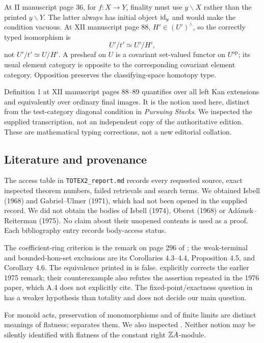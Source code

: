 \begin{remark}\label{D:typing}
At II manuscript page 36, for $f:X\to Y$, finality must use
$y\backslash X$ rather than the printed $y\backslash Y$.
The latter always has initial object $\mathrm{id}_y$ and would make
the condition vacuous. At XII manuscript page 88,
$H'\in(U')^\wedge$, so the correctly typed isomorphism is
\[
 U'/t'\simeq U'/H',
\]
not $U'/t'\simeq U/H'$. A presheaf on $U$ is a covariant
set-valued functor on $U^{\mathrm{op}}$; its usual element
category is opposite to the corresponding covariant element
category. Opposition preserves the classifying-space homotopy type.

Definition 1 at XII manuscript pages 88--89 quantifies over
all left Kan extensions and equivalently over ordinary final
images. It is the notion used here, distinct from the
test-category diagonal condition in \emph{Pursuing Stacks}.
We inspected the supplied transcription, not an independent
copy of the authoritative edition. These are mathematical
typing corrections, not a new editorial collation.
\end{remark}

\subsection{Literature and provenance}
The access table in \texttt{TOTEX2\_report.md} records every
requested source, exact inspected theorem numbers, failed
retrievals and search terms. We obtained Isbell (1968) and
Gabriel--Ulmer (1971), which had not been opened in the
supplied record. We did not obtain the bodies of Isbell (1974),
Oberst (1968) or Ad\'amek--Reiterman (1975). No claim about
their unopened contents is used as a proof. Each bibliography
entry records body-access status.

The coefficient-ring criterion is the remark on page 296 of
\citet{IsbellMitchell1976}; the weak-terminal and bounded-hom-set
exclusions are its Corollaries 4.3--4.4, Proposition 4.5, and
Corollary 4.6. The equivalence printed in
\citet[II.3]{AdamekReiterman1976} is false.
\citet[Remark A.4]{AdamekKoubekReiterman1981} explicitly corrects
the earlier 1975 remark; their counterexample also refutes the
assertion repeated in the 1976 paper, which A.4 does not explicitly cite.
The fixed-point/exactness question in
\citet[Problem 2.5]{Husainov2002} has a weaker hypothesis
than totality and does not decide our main question.

For monoid acts, preservation of monomorphisms and of finite
limits are distinct meanings of flatness;
\citet[Definition 1.6, Proposition 1.8, Theorems 2.32 and
2.49]{HemelaerRogers2021} separates them. We also inspected
\citet[Proposition 2.4 and the paragraph after Lemma 2.6]{LaanStrongFlat}.
Neither notion may be
silently identified with flatness of the constant right $\mathbb Z A$-module.


